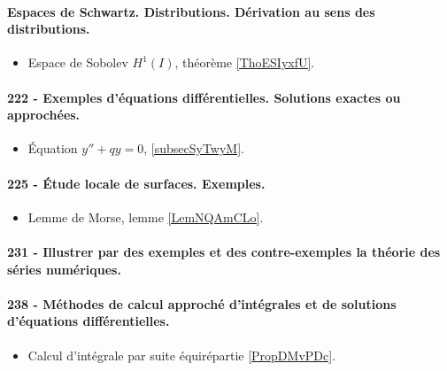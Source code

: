 \paragraph{Espaces de Schwartz. Distributions. Dérivation au sens des distributions.}
\begin{itemize}
    \item Espace de Sobolev \( H^1(I)\), théorème \ref{ThoESIyxfU}.
\end{itemize}

\paragraph{222 - Exemples d’équations différentielles. Solutions exactes ou approchées.}
\begin{itemize}
    \item Équation \( y''+qy=0\), \ref{subsecSyTwyM}.
\end{itemize}
\paragraph{225 - Étude locale de surfaces. Exemples.}
\begin{itemize}
    \item Lemme de Morse, lemme \ref{LemNQAmCLo}.
\end{itemize}
\paragraph{231 - Illustrer par des exemples et des contre-exemples la théorie des séries numériques.}
\paragraph{238 - Méthodes de calcul approché d’intégrales et de solutions d’équations différentielles.}
\begin{itemize}
    \item Calcul d'intégrale par suite équirépartie \ref{PropDMvPDc}.
\end{itemize}
